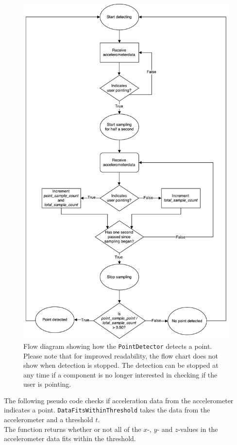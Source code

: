 \begin{figure}
\centering
\includegraphics[height=0.85\textheight]{images/point-detector-flow-chart}
\caption{Flow diagram showing how the \texttt{PointDetector} detects a point. Please note that for improved readability, the flow chart does not show when detection is stopped. The detection can be stopped at any time if a component is no longer interested in checking if the user is pointing.}
\label{fig:pointdetector-flow-chart}
\end{figure}

The following pseudo code checks if acceleration data from the accelerometer indicates a point. 
\texttt{DataFitsWithinThreshold} takes the data from the accelerometer and a threshold $t$. \\
The function returns whether or not all of the $x$-, $y$- and $z$-values in the accelerometer data fits within the threshold.


